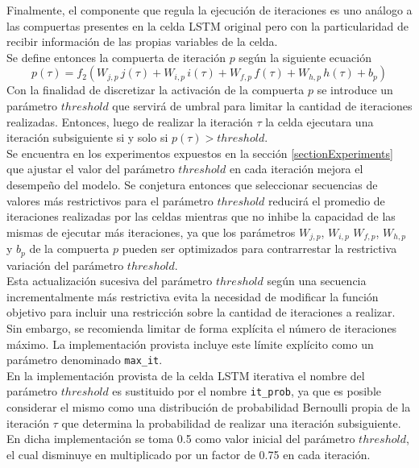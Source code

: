 \documentclass{article}
\begin{document}
	Finalmente, el componente que regula la ejecución de iteraciones es uno análogo a las compuertas presentes en la celda LSTM original pero con la particularidad de recibir información de las propias variables de la celda. \\
	Se define entonces la compuerta de iteración $p$ según la siguiente ecuación
	\begin{equation*}
	p(\tau) = f_2(W_{j, p} \, j(\tau) + W_{i, p} \, i(\tau) + W_{f, p} \, f(\tau) + W_{h, p} \, h(\tau) + b_p)
	\end{equation*}
	Con la finalidad de discretizar la activación de la compuerta $p$ se introduce un parámetro $threshold$ que servirá de umbral para limitar la cantidad de iteraciones realizadas. Entonces, luego de realizar la iteración $\tau$ la celda ejecutara una iteración subsiguiente si y solo si $p(\tau) > threshold$.\\
	Se encuentra en los experimentos expuestos en la sección \ref{sectionExperiments} que ajustar el valor del parámetro $threshold$ en cada iteración mejora el desempeño del modelo. Se conjetura entonces que seleccionar secuencias de valores más restrictivos para el parámetro $threshold$ reducirá el promedio de iteraciones realizadas por las celdas mientras que no inhibe la capacidad de las mismas de ejecutar más iteraciones, ya que los parámetros $W_{j, p}$, $W_{i, p}$ $W_{f, p}$, $W_{h, p}$ y $b_p$ de la compuerta $p$ pueden ser optimizados para contrarrestar la restrictiva variación del parámetro $threshold$.\\
	Esta actualización sucesiva del parámetro $threshold$ según una secuencia incrementalmente más restrictiva evita la necesidad de modificar la función objetivo para incluir una restricción sobre la cantidad de iteraciones a realizar. Sin embargo, se recomienda limitar de forma explícita el número de iteraciones máximo. La implementación provista incluye este límite explícito como un parámetro denominado \texttt{max\_it}.\\
	En la implementación provista de la celda LSTM iterativa el nombre del parámetro $threshold$ es sustituido por el nombre \texttt{it\_prob}, ya que es posible considerar el mismo como una distribución de probabilidad Bernoulli propia de la iteración $\tau$ que determina la probabilidad de realizar una iteración subsiguiente. En dicha implementación se toma 0.5 como valor inicial del parámetro $threshold$, el cual disminuye en multiplicado por un factor de 0.75 en cada iteración.\\
	
\end{document}
